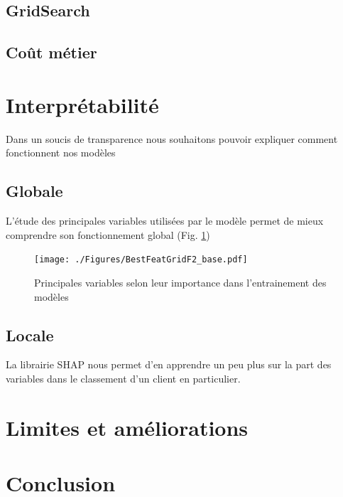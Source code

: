 \documentclass[12pt, a4paper]{article}
\begin{document}
\subsection{GridSearch}

\subsection{Coût métier}

\section{Interprétabilité}

Dans un soucis de transparence nous souhaitons pouvoir expliquer comment fonctionnent nos modèles

\subsection{Globale}

L'étude des principales variables utilisées par le modèle permet de mieux comprendre son fonctionnement global (Fig. \ref{fig:BestFeat})

\begin{figure}[h]
    \begin{center}
        \texttt{[image: ./Figures/BestFeatGridF2\_base.pdf]}
    \end{center}
    \caption{Principales variables selon leur importance dans l'entrainement des modèles}
    \label{fig:BestFeat}
\end{figure}

\subsection{Locale}

La librairie SHAP nous permet d'en apprendre un peu plus sur la part des variables dans le classement d'un client en particulier.

\section{Limites et améliorations}



\section{Conclusion}
\end{document}
